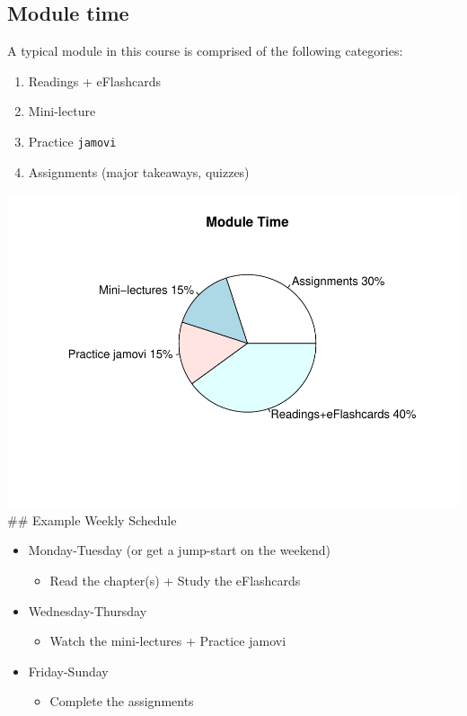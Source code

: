 \documentclass[11pt,]{article}
\makeatletter
\providecommand{\tightlist}{%
  \setlength{\itemsep}{0pt}\setlength{\parskip}{0pt}}
\def\maxwidth{\ifdim\Gin@nat@width>\linewidth\linewidth
\else\Gin@nat@width\fi}
\let\Oldincludegraphics\includegraphics
\renewcommand{\includegraphics}[1]{\Oldincludegraphics[width=\maxwidth]{#1}}
\makeatother
\begin{document}
\hypertarget{module-time}{%
\subsection{Module time}\label{module-time}}

A typical module in this course is comprised of the following
categories:

\begin{enumerate}
\def\labelenumi{\arabic{enumi}.}
\tightlist
\item
  Readings + eFlashcards
\item
  Mini-lecture
\item
  Practice \texttt{jamovi}
\item
  Assignments (major takeaways, quizzes)
\end{enumerate}

\includegraphics{KIN610-SP22_files/figure-latex/unnamed-chunk-1-1.pdf}
\#\# Example Weekly Schedule

\begin{itemize}
\tightlist
\item
  Monday-Tuesday (or get a jump-start on the weekend)

  \begin{itemize}
  \tightlist
  \item
    Read the chapter(s) + Study the eFlashcards
  \end{itemize}
\item
  Wednesday-Thursday

  \begin{itemize}
  \tightlist
  \item
    Watch the mini-lectures + Practice jamovi
  \end{itemize}
\item
  Friday-Sunday

  \begin{itemize}
  \tightlist
  \item
    Complete the assignments
  \end{itemize}
\end{itemize}
\end{document}
